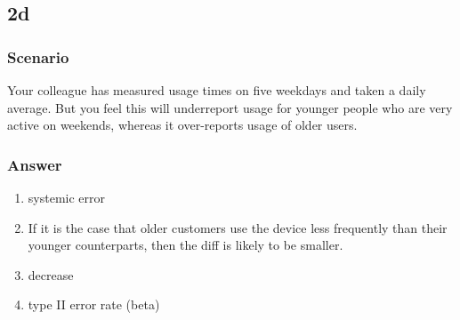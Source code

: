 \documentclass[
]{article}
\providecommand{\tightlist}{%
  \setlength{\itemsep}{0pt}\setlength{\parskip}{0pt}}
\begin{document}
\hypertarget{d}{%
\subsection{2d}\label{d}}

\hypertarget{scenario-3}{%
\subsubsection{\texorpdfstring{\textbf{Scenario}}{Scenario}}\label{scenario-3}}

Your colleague has measured usage times on five weekdays and taken a
daily average. But you feel this will underreport usage for younger
people who are very active on weekends, whereas it over-reports usage of
older users.

\hypertarget{answer-3}{%
\subsubsection{\texorpdfstring{\textbf{Answer}}{Answer}}\label{answer-3}}

\begin{enumerate}
\def\labelenumi{\arabic{enumi}.}
\tightlist
\item
  systemic error
\item
  If it is the case that older customers use the device less frequently
  than their younger counterparts, then the diff is likely to be
  smaller.
\item
  decrease
\item
  type II error rate (beta)
\end{enumerate}
\end{document}
